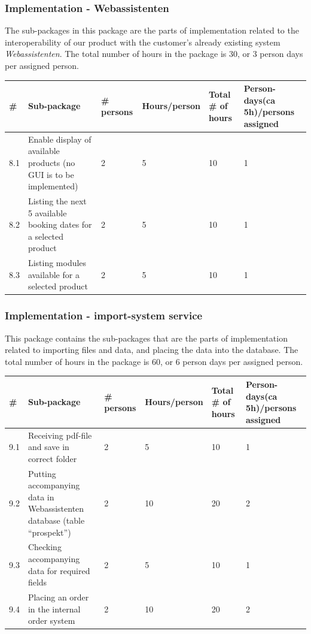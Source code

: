 \subsubsection{Implementation - Webassistenten}
The sub-packages in this package are the parts of implementation related to the interoperability of our product with the customer's already existing system \\ \emph{Webassistenten}. The total number of hours in the package is 30, or 3 person days per assigned person.
\begin{longtable}{|p{0.7cm}|p{3cm}|p{1.8cm}|p{2.5cm}|p{2cm}|p{2.8cm}|}
\hline
\# & Sub-package & \# persons & Hours/person & Total \# of hours & Person-days(ca 5h)/persons assigned\\ 
\hline
8.1 & Enable display of available products (no GUI is to be implemented) & 2 & 5 & 10 & 1\\ 
\hline
8.2 & Listing the next 5 available booking dates for a selected product & 2 & 5 & 10 & 1\\ 
\hline
8.3 & Listing modules available for a selected product & 2 & 5 & 10 & 1\\ 
\hline
\end{longtable}

\subsubsection{Implementation - import-system service}
This package contains the sub-packages that are the parts of implementation related to importing files and data, and placing the data into the database. The total number of hours in the package is 60, or 6 person days per assigned person.
\begin{longtable}{|p{0.7cm}|p{3cm}|p{1.8cm}|p{2.5cm}|p{2cm}|p{2.8cm}|}
\hline
\# & Sub-package & \# persons & Hours/person & Total \# of hours & Person-days(ca 5h)/persons assigned\\ 
\hline
9.1 & Receiving pdf-file and save in correct folder & 2 & 5 & 10 & 1\\ 
\hline
9.2 & Putting accompanying data in Webassistenten database (table “prospekt”) & 2 & 10 & 20 & 2\\ 
\hline
9.3 & Checking accompanying data for required fields & 2 & 5 & 10 & 1\\ 
\hline
9.4 & Placing an order in the internal order system & 2 & 10 & 20 & 2\\ 
\hline
\end{longtable}

